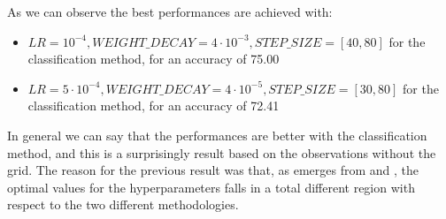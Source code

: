 \documentclass[10pt,twocolumn,hidelinks,letterpaper]{article}
\begin{document}
As we can observe the best performances are achieved with:
\begin{itemize}
  \item $LR = 10^{-4}, WEIGHT\_DECAY = 4 \cdot 10^{-3}, STEP\_SIZE = [40, 80]$ for the classification method, for an accuracy of 75.00
    \item $LR = 5 \cdot 10^{-4}, WEIGHT\_DECAY = 4 \cdot 10^{-5}, STEP\_SIZE = [30, 80]$ for the classification method, for an accuracy of 72.41
\end{itemize}

In general we can say that the performances are better with the classification method, and this is a surprisingly result based on the observations without the grid. The reason for the previous result was that, as emerges from  and , the optimal values for the hyperparameters falls in a total different region with respect to the two different methodologies.
\end{document}
